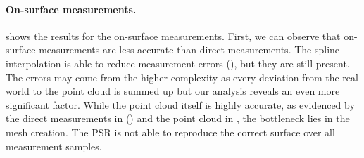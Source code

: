 \documentclass[letterpaper]{article} %
\begin{document}
\paragraph{On-surface measurements.}  shows the results for the on-surface measurements. First, we can observe that on-surface measurements are less accurate than direct measurements. The spline interpolation is able to reduce measurement errors (), but they are still present. The errors may come from the higher complexity as every deviation from the real world to the point cloud is summed up but our analysis reveals an even more significant factor. While the point cloud itself is highly accurate, as evidenced by the direct measurements in () and the point cloud in , the bottleneck lies in the mesh creation. The PSR is not able to reproduce the correct surface over all measurement samples.

\begin{table}[ht]
	\centering
	\caption{Comparison of Results from basic and spline-interpolated on-surface measurements with offline and online selection.}
	\label{table:onsurface}
\end{table}
\end{document}

